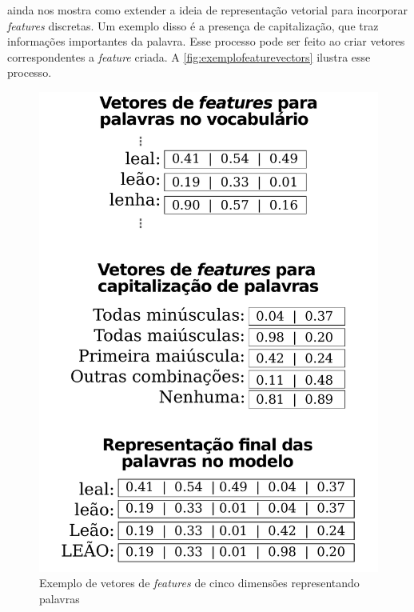  ainda nos mostra como extender a ideia de representação vetorial para incorporar \textit{features} discretas. Um exemplo disso é a presença de capitalização, que traz informações importantes da palavra. Esse processo pode ser feito ao criar vetores correspondentes a \textit{feature} criada. A \autoref{fig:exemplofeaturevectors} ilustra esse processo.

\begin{figure}[htb]
  \caption{Exemplo de vetores de \textit{features} de cinco dimensões representando palavras} \label{fig:exemplofeaturevectors}
  \begin{center}
      \includegraphics[scale=0.35]{img/exemplofeaturevectors.pdf}
  \end{center}
\end{figure}

